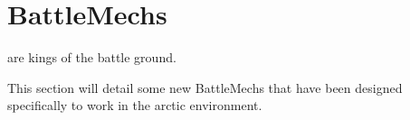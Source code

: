 \documentclass{tufte-book}
\begin{document}
\chapter{BattleMechs}
\label{ch:battlemechs}


 are kings of the battle ground. 

This section will detail some new BattleMechs that have been
designed specifically to work in the arctic environment.

\clearpage








\backmatter

% 
% 


\printindex
\end{document}
